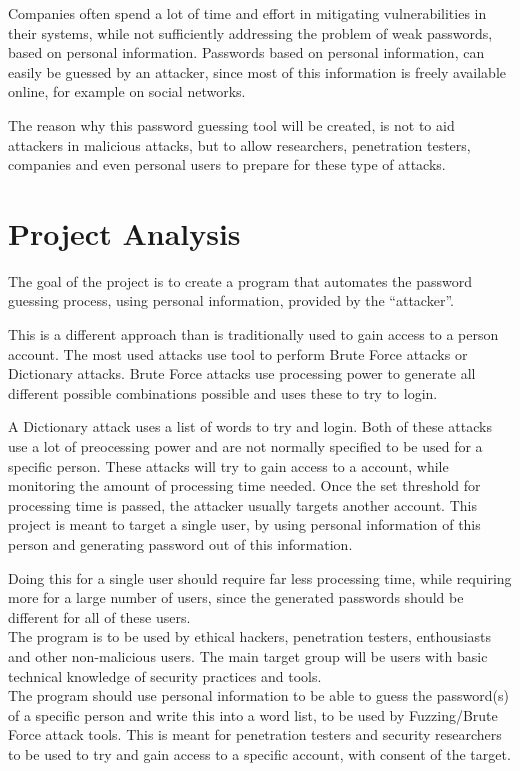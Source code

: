 \documentclass[a4paper,12pt]{article}
\begin{document}
Companies often spend a lot of time and effort in mitigating vulnerabilities in their systems, while not sufficiently addressing  the problem of weak passwords, based on personal information. Passwords based on personal information, can easily be guessed by an attacker, since most of this information is freely available online, for example on social networks.

The reason why this password guessing tool will be created, is not to aid attackers in malicious attacks, but to allow researchers, penetration testers, companies and even personal users to prepare for these type of attacks.

\section{Project Analysis}
The goal of the project is to create a program that automates the password guessing process, using personal information, provided by the ``attacker''.

This is a different approach than is traditionally used to gain access to a person account. The most used attacks use tool to perform Brute Force attacks or Dictionary attacks. Brute Force attacks use processing power to generate all different possible combinations possible and uses these to try to login.

A Dictionary attack uses a list of words to try and login. Both of these attacks use a lot of preocessing power and are not normally specified to be used for a specific person. These attacks will try to gain access to a account, while monitoring the amount of processing time needed. Once the set threshold for processing time is passed, the attacker usually targets another account. This project is meant to target a single user, by using personal information of this person and generating password out of this information.

Doing this for a single user should require far less processing time, while requiring more for a large number of users, since the generated passwords should be different for all of these users.\\

The program is to be used by ethical hackers, penetration testers, enthousiasts and other non-malicious users. The main target group will be users with basic technical knowledge of security practices and tools.\\

The program should use personal information to be able to guess the password(s) of a specific person and write this into a word list, to be used by Fuzzing/Brute Force attack tools. This is meant for penetration testers and security researchers to be used to try and gain access to a specific account, with consent of the target.\\
\end{document}
